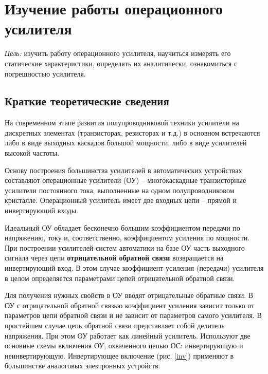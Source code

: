
\section{Изучение работы операционного усилителя}

{\it Цель:} изучить работу операционного усилителя, научиться измерять его статические характеристики, определять их аналитически, ознакомиться с погрешностью усилителя.
 
\subsection{Краткие теоретические сведения}

На современном этапе развития полупроводниковой техники усилители на дискретных элементах (транзисторах, резисторах и т.д.) в основном встречаются либо в виде выходных каскадов большой мощности, либо в виде усилителей высокой частоты.

Основу построения большинства усилителей в автоматических устройствах составляют операционные усилители (ОУ) -- многокаскадные транзисторные усилители постоянного тока, выполненные на одном полупроводниковом кристалле. 
Операционный усилитель имеет две входных цепи -- прямой и инвертирующий входы.

Идеальный ОУ обладает бесконечно большим коэффициентом передачи по напряжению, току и, соответственно, коэффициентом усиления по мощности. При построении усилителей систем автоматики на базе ОУ часть выходного сигнала через цепи {\bf отрицательной обратной связи} 
возвращается на инвертирующий вход. 
В этом случае коэффициент усиления (передачи) усилителя в целом определяется параметрами цепей отрицательной обратной связи.

Для получения нужных свойств в ОУ вводят отрицательные обратные связи. В ОУ с отрицательной обратной связью коэффициент усиления
зависит только от параметров цепи обратной связи и не зависит от параметров самого усилителя. В простейшем случае цепь 
обратной связи представляет собой делитель напряжения. При этом ОУ работает как линейный усилитель. Используют две основные
схемы включения ОУ, охваченного цепью ОС: инвертирующую и неинвертирующую. Инвертирующее включение (рис. \ref{inv}) применяют в 
большинстве аналоговых электронных устройств.

